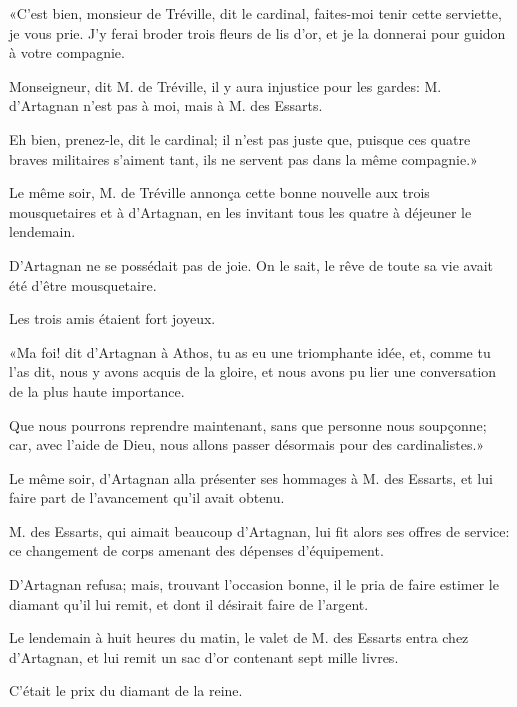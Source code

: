 «C'est bien, monsieur de Tréville, dit le cardinal, faites-moi tenir cette serviette, je vous prie. J'y ferai broder trois fleurs de lis d'or, et je la donnerai pour guidon à votre compagnie. 

\speak  Monseigneur, dit M. de Tréville, il y aura injustice pour les gardes: M. d'Artagnan n'est pas à moi, mais à M. des Essarts. 

\speak  Eh bien, prenez-le, dit le cardinal; il n'est pas juste que, puisque ces quatre braves militaires s'aiment tant, ils ne servent pas dans la même compagnie.» 

Le même soir, M. de Tréville annonça cette bonne nouvelle aux trois mousquetaires et à d'Artagnan, en les invitant tous les quatre à déjeuner le lendemain. 

D'Artagnan ne se possédait pas de joie. On le sait, le rêve de toute sa vie avait été d'être mousquetaire. 

Les trois amis étaient fort joyeux. 

«Ma foi! dit d'Artagnan à Athos, tu as eu une triomphante idée, et, comme tu l'as dit, nous y avons acquis de la gloire, et nous avons pu lier une conversation de la plus haute importance. 

\speak  Que nous pourrons reprendre maintenant, sans que personne nous soupçonne; car, avec l'aide de Dieu, nous allons passer désormais pour des cardinalistes.» 

Le même soir, d'Artagnan alla présenter ses hommages à M. des Essarts, et lui faire part de l'avancement qu'il avait obtenu. 

M. des Essarts, qui aimait beaucoup d'Artagnan, lui fit alors ses offres de service: ce changement de corps amenant des dépenses d'équipement. 

D'Artagnan refusa; mais, trouvant l'occasion bonne, il le pria de faire estimer le diamant qu'il lui remit, et dont il désirait faire de l'argent. 

Le lendemain à huit heures du matin, le valet de M. des Essarts entra chez d'Artagnan, et lui remit un sac d'or contenant sept mille livres. 

C'était le prix du diamant de la reine. 